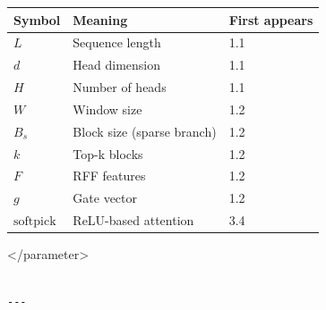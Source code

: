 \begin{table}[H]
\centering
\small
\begin{tabular}{lll}
\toprule
\textbf{Symbol} & \textbf{Meaning} & \textbf{First appears} \\
\midrule
$L$ & Sequence length & 1.1 \\
$d$ & Head dimension & 1.1 \\
$H$ & Number of heads & 1.1 \\
$W$ & Window size & 1.2 \\
$B_s$ & Block size (sparse branch) & 1.2 \\
$k$ & Top-k blocks & 1.2 \\
$F$ & RFF features & 1.2 \\
$g$ & Gate vector & 1.2 \\
$\text{softpick}$ & ReLU-based attention & 3.4 \\
\bottomrule
\end{tabular}
\end{table}
\textless{}/parameter\textgreater{}
\begin{lstlisting}

---
\end{lstlisting}